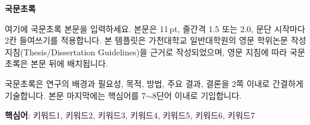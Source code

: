 \clearpage
\thispagestyle{plain}

\begin{center}
{\fontsize{16pt}{22pt}\selectfont\bfseries 국문초록\par}

\vspace{8mm}

{\fontsize{14pt}{20pt}\selectfont\bfseries \ThesisTitleKR\par}
\end{center}

\vspace{6mm}

\begin{flushright}
{\fontsize{12pt}{18pt}\selectfont
\AuthorKR\par
\DepartmentKR\par
\GraduateSchoolKR\par}
\end{flushright}

\vspace{8mm}


여기에 국문초록 본문을 입력하세요. 본문은 11\,pt, 줄간격 1.5 또는 2.0,
문단 시작마다 2칸 들여쓰기를 적용합니다. 본 템플릿은 가천대학교 일반대학원의
영문 학위논문 작성지침(Thesis/Dissertation Guidelines)을 근거로 작성되었으며,
영문 지침에 따라 국문초록은 본문 뒤에 배치됩니다.

국문초록은 연구의 배경과 필요성, 목적, 방법, 주요 결과, 결론을 2쪽 이내로
간결하게 기술합니다. 본문 마지막에는 핵심어를 7$\sim$8단어 이내로 기입합니다.

\vfill

\noindent\textbf{핵심어}: 키워드1, 키워드2, 키워드3, 키워드4, 키워드5, 키워드6, 키워드7

\clearpage
